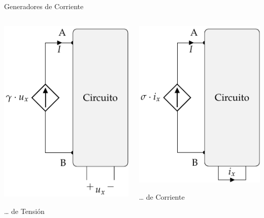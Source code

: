 \documentclass[aspectratio=169, usenames,svgnames,dvipsnames]{beamer}
\begin{document}
\begin{frame}[label={sec:orge8aa3e0}]{Generadores de Corriente}
\begin{columns}
\begin{column}{0.5\columnwidth}
 \begin{center}
\includegraphics[height=0.7\textheight]{../figs/FuenteCorrienteDependienteTension.pdf}
\end{center}
\ldots{} de Tensión
\end{column}
\begin{column}{0.5\columnwidth}
 \begin{center}
\includegraphics[height=0.7\textheight]{../figs/FuenteCorrienteDependienteCorriente.pdf}
\end{center}
\ldots{} de Corriente
\end{column}
\end{columns}
\end{frame}
\end{document}
